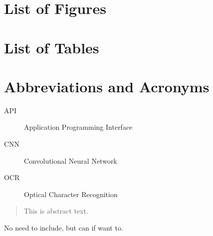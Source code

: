 \uomtoc

  \section*{List of Figures}

  \section*{List of Tables}

  \section*{Abbreviations and Acronyms}

    \begin{description}
      \item[API] Application Programming Interface
      \item[CNN] Convolutional Neural Network
      \item[OCR] Optical Character Recognition
    \end{description}

\begin{abstract} %
  This is abstract text. 

\end{abstract}%
\clearpage



\uomdeclarations %



\begin{uomacknowledgements}
No need to include, but can if want to.
\end{uomacknowledgements}



